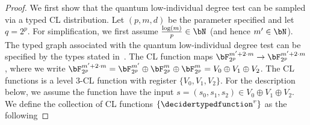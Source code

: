 \begin{proof}
We first show that the quantum low-individual degree test can be sampled via a typed CL distribution. Let $(p,m,d)$ be the parameter specified and let $q = 2^p$. For simplification, we first assume $\frac{\log(m)}{p} \in \bN$ (and hence $m' \in \bN$). The typed graph associated with the quantum low-individual degree test can be specified by the types stated in~. The CL function maps $\bF_{2^p}^{m' + 2 \cdot m} \rightarrow \bF_{2^p}^{m' + 2 \cdot m}$, where we write $\bF_{2^p}^{m' + 2 \cdot m} = \bF_{2^p}^{m'} \oplus \bF_{2^p}^m \oplus \bF_{2^p}^m  =  V_0 \oplus V_1 \oplus V_2$. The CL functions is a level $3$-CL function with register $\{V_0, V_1, V_2\}$. For the description below, we assume the function have the input $s = (s_0, s_1, s_2) \in V_0 \oplus V_1 \oplus V_2$. We define the collection of CL functions $\{\decidertypedfunction^v\}$ as the following


\end{proof}
